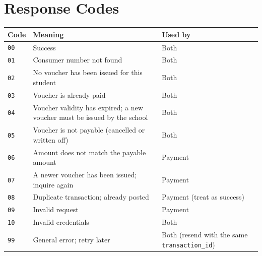 \documentclass[11pt]{article}
\begin{document}
\section{Response Codes}
\begin{center}
\begin{tabularx}{\textwidth}{@{}l L P{0.3\textwidth}@{}}
\toprule
\textbf{Code} & \textbf{Meaning} & \textbf{Used by} \\
\midrule
\texttt{00} & Success & Both \\
\texttt{01} & Consumer number not found & Both \\
\texttt{02} & No voucher has been issued for this student & Both \\
\texttt{03} & Voucher is already paid & Both \\
\texttt{04} & Voucher validity has expired; a new voucher must be issued by the school & Both \\
\texttt{05} & Voucher is not payable (cancelled or written off) & Both \\
\texttt{06} & Amount does not match the payable amount & Payment \\
\texttt{07} & A newer voucher has been issued; inquire again & Payment \\
\texttt{08} & Duplicate transaction; already posted & Payment (treat as success) \\
\texttt{09} & Invalid request & Payment \\
\texttt{10} & Invalid credentials & Both \\
\texttt{99} & General error; retry later & Both (resend with the same \texttt{transaction\_id}) \\
\bottomrule
\end{tabularx}
\end{center}

\end{document}
